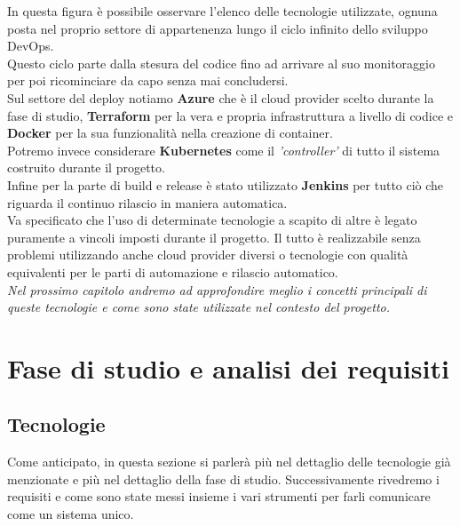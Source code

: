 \documentclass[a4paper,12pt]{report}
\begin{document}
In questa figura è possibile osservare l'elenco delle tecnologie utilizzate, ognuna posta nel proprio settore di appartenenza lungo il ciclo infinito dello sviluppo DevOps.\cite{devopsloop}\\
Questo ciclo parte dalla stesura del codice fino ad arrivare al suo monitoraggio per poi ricominciare da capo senza mai concludersi.\\
Sul settore del deploy notiamo \textbf{Azure} che è il cloud provider scelto durante la fase di studio, \textbf{Terraform} per la vera e propria infrastruttura a livello di codice e \textbf{Docker} per la sua funzionalità nella creazione di container.\\
Potremo invece considerare \textbf{Kubernetes}  come il \textit{'controller'} di tutto il sistema costruito durante il progetto.\\
Infine per la parte di build e release è stato utilizzato \textbf{Jenkins} per tutto ciò che riguarda il continuo rilascio in maniera automatica.\\
Va specificato che l'uso di determinate tecnologie a scapito di altre è legato puramente a vincoli imposti durante il progetto. Il tutto è realizzabile senza problemi utilizzando anche cloud provider diversi o tecnologie con qualità equivalenti per le parti di automazione e rilascio automatico.\\
\textit{Nel prossimo capitolo andremo ad approfondire meglio i concetti principali di queste tecnologie e come sono state utilizzate nel contesto del progetto.}


\chapter{Fase di studio e analisi dei requisiti}
\section{Tecnologie}
Come anticipato, in questa sezione si parlerà più nel dettaglio delle tecnologie già menzionate e più nel dettaglio della fase di studio. Successivamente rivedremo i requisiti e come sono state messi insieme i vari strumenti per farli comunicare come un sistema unico.
\end{document}
